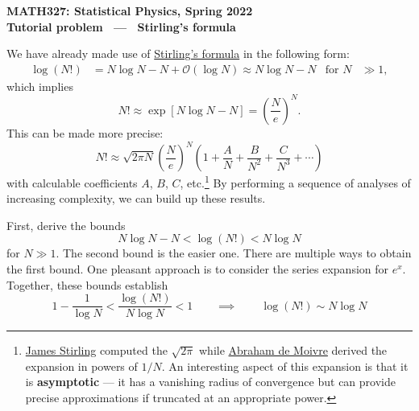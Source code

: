 \documentclass[12 pt]{article} %
\newcommand{\cO}{\ensuremath{\mathcal O} }
\begin{document}
\newcommand{\thisweek}{MATH327 Tutorial (Stirling)}
\newcommand{\moddate}{Last modified 19 Feb.~2022}
\begin{center}
  {\Large \textbf{MATH327: Statistical Physics, Spring 2022}} \\[12 pt]
  {\Large \textbf{Tutorial problem \ --- \ Stirling's formula}} \\[24 pt]
\end{center}

We have already made use of \href{https://en.wikipedia.org/wiki/Stirling's_approximation}{Stirling's formula} in the following form:
\begin{align*}
  \log(N!) & = N \log N - N + \cO(\log N) \approx N \log N - N &
  \mbox{for } N & \gg 1,
\end{align*}
which implies
\begin{equation*}
  N! \approx \exp\left[N\log N - N\right] = \left(\frac{N}{e}\right)^N.
\end{equation*}
This can be made more precise:
\begin{equation}
  \label{eq:full}
  N! \approx \sqrt{2\pi N} \left(\frac{N}{e}\right)^N \left(1 + \frac{A}{N} + \frac{B}{N^2} + \frac{C}{N^3} + \cdots\right)
\end{equation}
with calculable coefficients $A$, $B$, $C$, etc.\footnote{\href{https://en.wikipedia.org/wiki/James_Stirling_(mathematician)}{James Stirling} computed the $\sqrt{2\pi}$ while \href{https://en.wikipedia.org/wiki/Abraham_de_Moivre}{Abraham de Moivre} derived the expansion in powers of $1 / N$.  An interesting aspect of this expansion is that it is \textbf{asymptotic} --- it has a vanishing radius of convergence but can provide precise approximations if truncated at an appropriate power.}
By performing a sequence of analyses of increasing complexity, we can build up these results.

First, derive the bounds
\begin{equation}
  N\log N - N < \log(N!) < N\log N
\end{equation}
for $N \gg 1$.
The second bound is the easier one.
There are multiple ways to obtain the first bound.
One pleasant approach is to consider the series expansion for $e^x$.
Together, these bounds establish
\begin{equation*}
  1 - \frac{1}{\log N} < \frac{\log(N!)}{N\log N} < 1 \qquad \implies \qquad \log(N!) \sim N\log N
\end{equation*}
\end{document}
